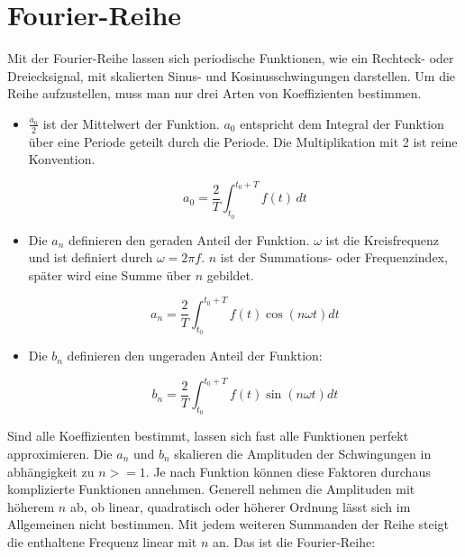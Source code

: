 %
%
%
%

\section{Fourier-Reihe\label{fourier:section:GrundlagenFourierAnalyse}}


Mit der Fourier-Reihe lassen sich periodische Funktionen, wie ein Rechteck- oder Dreiecksignal, mit skalierten Sinus- und Kosinusschwingungen darstellen. 
Um die Reihe aufzustellen, muss man nur drei Arten von Koeffizienten bestimmen. 

\begin{itemize}
	\item $\frac{a_0}{2}$ ist der Mittelwert der Funktion. 
	$a_0$ entspricht dem Integral der Funktion über eine Periode geteilt durch die Periode.
	Die Multiplikation mit 2 ist reine Konvention.
	
	\begin{equation}
		a_0 = \frac{2}{T} \int_{t_0}^{t_0 + T} f(t) \, dt
	\end{equation}
	
	\item Die $a_n$ definieren den geraden Anteil der Funktion. $\omega$ ist die Kreisfrequenz und ist definiert durch $\omega = 2\pi f$. 
	$n$ ist der Summations- oder Frequenzindex, später wird eine Summe über $n$ gebildet.
	
	\begin{equation}
		a_n = \frac{2}{T} \int_{t_0}^{t_0 + T} f(t) \cos\left(n\omega t\right) dt
	\end{equation}
	
	\item Die $b_n$ definieren den ungeraden Anteil der Funktion:
	
	\begin{equation}
		b_n = \frac{2}{T} \int_{t_0}^{t_0 + T} f(t) \sin\left(n\omega t\right) dt
	\end{equation}
	
\end{itemize}


Sind alle Koeffizienten bestimmt, lassen sich fast alle Funktionen perfekt approximieren.
Die $a_n$ und $b_n$ skalieren die Amplituden der Schwingungen in abhängigkeit zu $n>=1$. 
Je nach Funktion können diese Faktoren durchaus komplizierte Funktionen annehmen.
Generell nehmen die Amplituden mit höherem $n$ ab, ob linear, quadratisch oder höherer Ordnung lässt sich im Allgemeinen nicht bestimmen.
Mit jedem weiteren Summanden der Reihe steigt die enthaltene Frequenz linear mit $n$ an.
Das ist die Fourier-Reihe:


